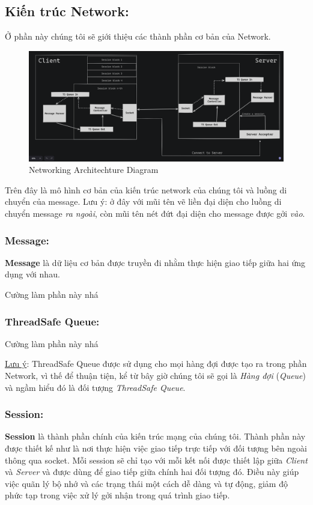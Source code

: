 \subsection{Kiến trúc Network: }
\label{sec:network-archi}
Ở phần này chúng tôi sẽ giới thiệu các thành phần cơ bản của Network. \\

\begin{figure}[H]
	\centering
	\includegraphics[width=\linewidth]{latex/architechture/architechture_diagram.png}
	\caption{Networking Architechture Diagram}
	\label{fig:network}
\end{figure}

Trên đây là mô hình cơ bản của kiến trúc network của chúng tôi và luồng di chuyển của message. Lưu ý: ở đây với mũi tên vẽ liền đại diện cho luồng di chuyển message \textit{ra ngoài}, còn mũi tên nét đứt đại diện cho message được gởi \textit{vào}.

\subsubsection{Message: }
\label{sec:message}
\textbf{Message} là dữ liệu cơ bản được truyền đi nhằm thực hiện giao tiếp giữa hai ứng dụng với nhau.

Cường làm phần này nhá
\subsubsection{ThreadSafe Queue: }
Cường làm phần này nhá

\underline{Lưu ý}: ThreadSafe Queue được sử dụng cho mọi hàng đợi được tạo ra trong phần Network, vì thế để thuận tiện, kể từ bây giờ chúng tôi sẽ gọi là \textit{Hàng đợi} (\textit{Queue}) và ngầm hiểu đó là đối tượng \textit{ThreadSafe Queue}.

\subsubsection{Session: }
\textbf{Session} là thành phần chính của kiến trúc mạng của chúng tôi. Thành phần này được thiết kế như là nơi thực hiện việc giao tiếp trực tiếp với đối tượng bên ngoài thông qua socket. Mỗi session sẽ chỉ tạo với mỗi kết nối được thiết lập giữa \textit{Client} và \textit{Server} và được dùng để giao tiếp giữa chính hai đối tượng đó. Điều này giúp việc quãn lý bộ nhớ và các trạng thái một cách dễ dàng và tự động, giảm độ phức tạp trong việc xử lý gởi nhận trong quá trình giao tiếp.

